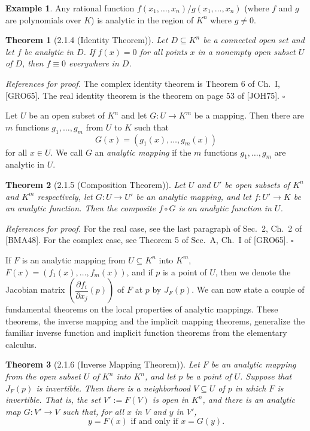 \documentclass[11pt]{article}
\theoremstyle{plain}
\newtheorem*{theorem*}{Theorem}
\theoremstyle{definition}
\newtheorem*{example}{Example}
\begin{document}
\begin{example}
Any rational function $f(x_1, \ldots, x_n)/g(x_1, \ldots, x_n)$ (where
$f$ and $g$ are polynomials over $K$) is analytic in the region of $K^n$
where $g \ne 0$.
\end{example}

\begin{theorem*}[2.1.4 (Identity Theorem)]
Let $D \subseteq K^n$ be a connected open set and let $f$ be analytic in
$D$. If $f(x) = 0$ for all points $x$ in a nonempty open subset $U$ of
$D$, then $f \equiv 0$ everywhere in $D$.
\end{theorem*}

\textit{References for proof.} The complex identity theorem is Theorem 6
of Ch.~I, [GRO65]. The real identity theorem is the theorem on page 53
of [JOH75]. $\square$

Let $U$ be an open subset of $K^n$ and let $G: U \to K^m$ be a mapping.
Then there are $m$ functions $g_1, \ldots, g_m$ from $U$ to $K$ such that
\[
G(x) = (g_1(x), \ldots, g_m(x))
\]
for all $x \in U$. We call $G$ an \emph{analytic mapping} if the $m$
functions $g_1, \ldots, g_m$ are analytic in $U$.

\begin{theorem*}[2.1.5 (Composition Theorem)]
Let $U$ and $U'$ be open subsets of $K^n$ and $K^m$ respectively, let
$G: U \to U'$ be an analytic mapping, and let $f: U' \to K$ be an
analytic function. Then the composite $f \circ G$ is an analytic function
in $U$.
\end{theorem*}

\textit{References for proof.} For the real case, see the last paragraph
of Sec.~2, Ch.~2 of [BMA48]. For the complex case, see Theorem 5 of
Sec.~A, Ch.~I of [GRO65]. $\square$

If $F$ is an analytic mapping from $U \subseteq K^n$ into $K^m$,
$F(x) = (f_1(x), \ldots, f_m(x))$, and if $p$ is a point of $U$, then we
denote the Jacobian matrix $\left(\dfrac{\partial f_i}{\partial x_j}(p)\right)$
of $F$ at $p$ by $J_F(p)$. We can now state a couple of fundamental
theorems on the local properties of analytic mappings. These theorems,
the inverse mapping and the implicit mapping theorems, generalize the
familiar inverse function and implicit function theorems from the
elementary calculus.

\begin{theorem*}[2.1.6 (Inverse Mapping Theorem)]
Let $F$ be an analytic mapping from the open subset $U$ of $K^n$ into
$K^n$, and let $p$ be a point of $U$. Suppose that $J_F(p)$ is
invertible. Then there is a neighborhood $V \subseteq U$ of $p$ in which
$F$ is invertible. That is, the set $V' := F(V)$ is open in $K^n$, and
there is an analytic map $G: V' \to V$ such that, for all $x$ in $V$ and
$y$ in $V'$,
\[
y = F(x) \text{ if and only if } x = G(y).
\]
\end{theorem*}
\end{document}
